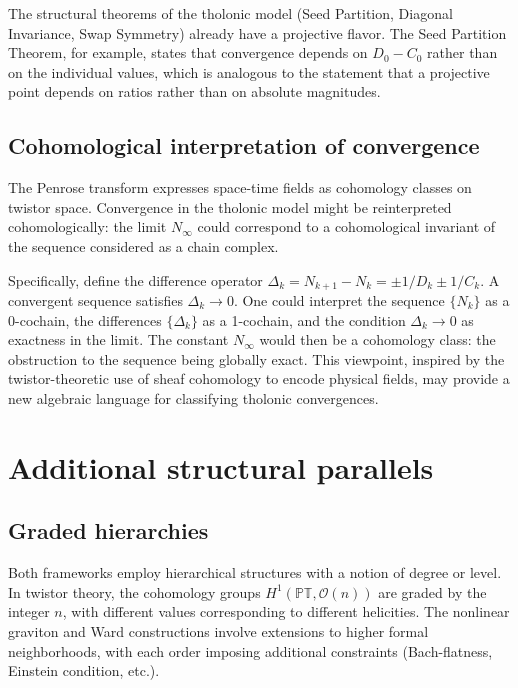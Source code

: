 \documentclass[12pt]{article}
\begin{document}
The structural theorems of the tholonic model (Seed Partition, Diagonal
Invariance, Swap Symmetry) already have a projective flavor. The Seed
Partition Theorem, for example, states that convergence depends on
\(D_0 - C_0\) rather than on the individual values, which is analogous
to the statement that a projective point depends on ratios rather than
on absolute magnitudes.

\subsection{Cohomological interpretation of convergence}\label{cohomological-interpretation-of-convergence}

The Penrose transform expresses space-time fields as cohomology classes
on twistor space. Convergence in the tholonic model might be
reinterpreted cohomologically: the limit \(N_\infty\) could correspond
to a cohomological invariant of the sequence considered as a chain
complex.

Specifically, define the difference operator
\(\Delta_k = N_{k+1} - N_k = \pm 1/D_k \pm 1/C_k\). A convergent
sequence satisfies \(\Delta_k \to 0\). One could interpret the sequence
\(\{N_k\}\) as a 0-cochain, the differences \(\{\Delta_k\}\) as a
1-cochain, and the condition \(\Delta_k \to 0\) as exactness in the
limit. The constant \(N_\infty\) would then be a cohomology class: the
obstruction to the sequence being globally exact. This viewpoint,
inspired by the twistor-theoretic use of sheaf cohomology to encode
physical fields, may provide a new algebraic language for classifying
tholonic convergences.

\section{Additional structural parallels}\label{additional-structural-parallels}

\subsection{Graded hierarchies}\label{graded-hierarchies}

Both frameworks employ hierarchical structures with a notion of degree
or level. In twistor theory, the cohomology groups
\(H^1(\mathbb{PT}, \mathcal{O}(n))\) are graded by the integer \(n\),
with different values corresponding to different helicities. The
nonlinear graviton and Ward constructions involve extensions to higher
formal neighborhoods, with each order imposing additional constraints
(Bach-flatness, Einstein condition, etc.).
\end{document}
